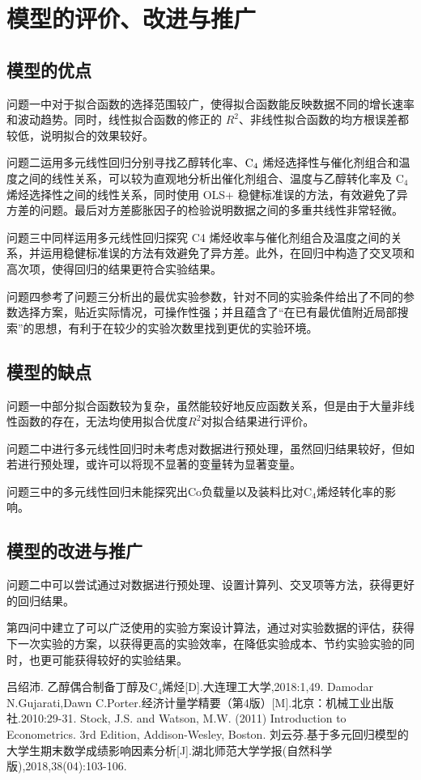 \documentclass[a4paper,10.5pt]{ctexart}
\begin{document}
\section{模型的评价、改进与推广}
\subsection{模型的优点}
\par 问题一中对于拟合函数的选择范围较广，使得拟合函数能反映数据不同的增长速率和波动趋势。同时，线性拟合函数的修正的 $R^2$、非线性拟合函数的均方根误差都较低，说明拟合的效果较好。
\par 问题二运用多元线性回归分别寻找乙醇转化率、${\rm C}_4$ 烯烃选择性与催化剂组合和温度之间的线性关系，可以较为直观地分析出催化剂组合、温度与乙醇转化率及 C$_4$ 烯烃选择性之间的线性关系，同时使用 OLS+ 稳健标准误的方法，有效避免了异方差的问题。最后对方差膨胀因子的检验说明数据之间的多重共线性非常轻微。
\par 问题三中同样运用多元线性回归探究 C4 烯烃收率与催化剂组合及温度之间的关系，并运用稳健标准误的方法有效避免了异方差。此外，在回归中构造了交叉项和高次项，使得回归的结果更符合实验结果。
\par 问题四参考了问题三分析出的最优实验参数，针对不同的实验条件给出了不同的参数选择方案，贴近实际情况，可操作性强；并且蕴含了“在已有最优值附近局部搜索”的思想，有利于在较少的实验次数里找到更优的实验环境。
\subsection{模型的缺点}
问题一中部分拟合函数较为复杂，虽然能较好地反应函数关系，但是由于大量非线性函数的存在，无法均使用拟合优度$R^2$对拟合结果进行评价。
\par 问题二中进行多元线性回归时未考虑对数据进行预处理，虽然回归结果较好，但如若进行预处理，或许可以将现不显著的变量转为显著变量。
\par 问题三中的多元线性回归未能探究出Co负载量以及装料比对C$_4$烯烃转化率的影响。

\subsection{模型的改进与推广}
问题二中可以尝试通过对数据进行预处理、设置计算列、交叉项等方法，获得更好的回归结果。

第四问中建立了可以广泛使用的实验方案设计算法，通过对实验数据的评估，获得下一次实验的方案，以获得更高的实验效率，在降低实验成本、节约实验实验的同时，也更可能获得较好的实验结果。


\renewcommand\refname{参考文献}
	\begin{thebibliography}{100}%

吕绍沛. 乙醇偶合制备丁醇及C$_4$烯烃[D].大连理工大学,2018:1,49.
Damodar N.Gujarati,Dawn C.Porter.经济计量学精要（第4版）[M].北京：机械工业出版社.2010:29-31.
Stock, J.S. and Watson, M.W. (2011) Introduction to Econometrics. 3rd Edition, Addison-Wesley, Boston.
刘云芬.基于多元回归模型的大学生期末数学成绩影响因素分析[J].湖北师范大学学报(自然科学版),2018,38(04):103-106.
	\end{thebibliography}
\clearpage
\end{document}
